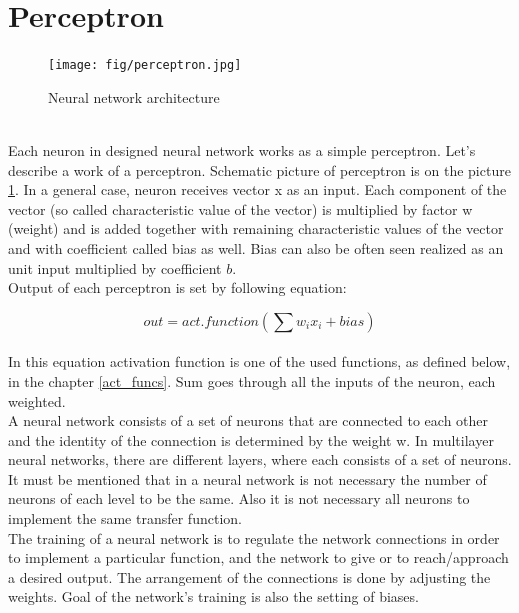 \documentclass[a4paper,oneside,onecolumn,11pt]{report}
\begin{document}
	\section{Perceptron}

		\begin{figure}
			\centering
			\texttt{[image: fig/perceptron.jpg]}
			\caption{Neural network architecture}
			\label{perceptron}
		\end{figure}\\

		Each neuron in designed neural network works as a simple perceptron. Let's describe a work of
		a perceptron. Schematic picture of perceptron is on the picture \ref{perceptron}. In a general case,
		neuron receives vector x as an input. Each component of the vector (so called characteristic
		value of the vector) is multiplied by factor w (weight) and is added together with remaining
		characteristic values of the vector and with coefficient called bias as well. Bias can also be often seen 
		realized as an unit input multiplied by coefficient $b$.\\

		Output of each perceptron is set by following equation:

		\begin{equation}
			out = act.function \left( \sum w_i x_i + bias \right)
		\end{equation}\\

		In this equation activation function is one of the used functions, as defined below, in the chapter
		\ref{act_funcs}. Sum goes through all the inputs of the neuron, each weighted.\\

		A neural network consists of a set of neurons that are connected to each other and the identity 
		of the connection is determined by the weight w. In multilayer neural networks, there are different 
		layers, where each consists of a set of neurons. It must be mentioned 
		that in a neural network is not necessary the number of neurons of each level to be the same. 
		Also it is not necessary all neurons to implement the same transfer function.\\

		The training of a neural network is to regulate 
		the network connections in order to implement a particular function, and the network to give or 
		to reach/approach a desired output. The arrangement of the connections is done by adjusting the 
		weights. Goal of the network’s training is also the setting of biases. \cite{Eberhartc2007}
\end{document}
